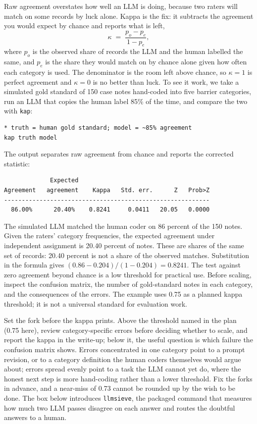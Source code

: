 \documentclass[
    a4paper,
    fontsize=10pt,
    twoside=true,
    numbers=noenddot,
]{kaobook}
\begin{document}
Raw agreement overstates how well an LLM is doing, because two raters will match on some records by luck alone. Kappa is the fix: it subtracts the agreement you would expect by chance and reports what is left,
\[
\kappa \;=\; \frac{p_o - p_e}{1 - p_e},
\]
where $p_o$ is the observed share of records the LLM and the human labelled the same, and $p_e$ is the share they would match on by chance alone given how often each category is used. The denominator is the room left above chance, so $\kappa=1$ is perfect agreement and $\kappa=0$ is no better than luck. To see it work, we take a simulated gold standard of 150 case notes hand-coded into five barrier categories, run an LLM that copies the human label 85\% of the time, and compare the two with \texttt{kap}:
\par
{\footnotesize
\begin{verbatim}
* truth = human gold standard; model = ~85% agreement
kap truth model
\end{verbatim}
}
The output separates raw agreement from chance and reports the corrected statistic:
\par
{\footnotesize
\begin{verbatim}
             Expected
Agreement   agreement    Kappa   Std. err.      Z   Prob>Z
----------------------------------------------------------
  86.00%      20.40%    0.8241     0.0411   20.05   0.0000
\end{verbatim}
}
The simulated LLM matched the human coder on 86 percent of the 150 notes. Given the raters' category frequencies, the expected agreement under independent assignment is 20.40 percent of notes. These are shares of the same set of records: 20.40 percent is not a share of the observed matches. Substitution in the formula gives $(0.86-0.204)/(1-0.204)=0.8241$. The test against zero agreement beyond chance is a low threshold for practical use. Before scaling, inspect the confusion matrix, the number of gold-standard notes in each category, and the consequences of the errors. The example uses 0.75 as a planned kappa threshold; it is not a universal standard for evaluation work.

Set the fork before the kappa prints. Above the threshold named in the plan (0.75 here), review category-specific errors before deciding whether to scale, and report the kappa in the write-up; below it, the useful question is which failure the confusion matrix shows. Errors concentrated in one category point to a prompt revision, or to a category definition the human coders themselves would argue about; errors spread evenly point to a task the LLM cannot yet do, where the honest next step is more hand-coding rather than a lower threshold. Fix the forks in advance, and a near-miss of 0.73 cannot be rounded up by the wish to be done. The box below introduces \texttt{llmsieve}, the packaged command that measures how much two LLM passes disagree on each answer and routes the doubtful answers to a human.
\end{document}

